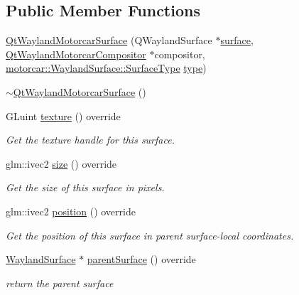 \subsection*{Public Member Functions}
\begin{DoxyCompactItemize}
\item 
\hyperlink{classqtmotorcar_1_1QtWaylandMotorcarSurface_a054d4981e7da338c72e4fa6572869b60}{Qt\-Wayland\-Motorcar\-Surface} (Q\-Wayland\-Surface $\ast$\hyperlink{simple-egl_8c_a0720952aa1caded45b5bcdce589663a9}{surface}, \hyperlink{classqtmotorcar_1_1QtWaylandMotorcarCompositor}{Qt\-Wayland\-Motorcar\-Compositor} $\ast$compositor, \hyperlink{classmotorcar_1_1WaylandSurface_a7715a41b6776800656722407ec01e0a5}{motorcar\-::\-Wayland\-Surface\-::\-Surface\-Type} \hyperlink{classmotorcar_1_1WaylandSurface_a0e6e5e2455666f607a8ddb2479ba8e88}{type})
\item 
\hyperlink{classqtmotorcar_1_1QtWaylandMotorcarSurface_a0d9d57d75c14c209484174e47308f72f}{$\sim$\-Qt\-Wayland\-Motorcar\-Surface} ()
\item 
G\-Luint \hyperlink{classqtmotorcar_1_1QtWaylandMotorcarSurface_a573c52cdacb8f16c06ecd111bddabef6}{texture} () override
\begin{DoxyCompactList}\small\item\em Get the texture handle for this surface. \end{DoxyCompactList}\item 
glm\-::ivec2 \hyperlink{classqtmotorcar_1_1QtWaylandMotorcarSurface_ad5e6f75c146a2952652deaf866ee22a7}{size} () override
\begin{DoxyCompactList}\small\item\em Get the size of this surface in pixels. \end{DoxyCompactList}\item 
glm\-::ivec2 \hyperlink{classqtmotorcar_1_1QtWaylandMotorcarSurface_ad405b91565405e6a08d86ac5d59f3f08}{position} () override
\begin{DoxyCompactList}\small\item\em Get the position of this surface in parent surface-\/local coordinates. \end{DoxyCompactList}\item 
\hyperlink{classmotorcar_1_1WaylandSurface_a3d89131a3967483a4b8e31abae122059}{Wayland\-Surface} $\ast$ \hyperlink{classqtmotorcar_1_1QtWaylandMotorcarSurface_a3b0aed06d7ed9287497bc342f9fc787b}{parent\-Surface} () override
\begin{DoxyCompactList}\small\item\em return the parent surface \end{DoxyCompactList}\item 

\end{DoxyCompactItemize}
